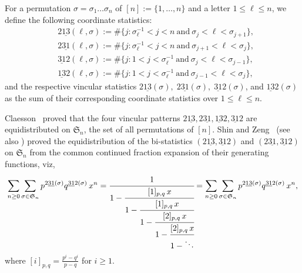\documentclass[12pt,reqno]{amsart}
\numberwithin{equation}{section}
\theoremstyle{plain}
\theoremstyle{definition}
\def\Sym{\mathfrak{S}}
\def\rasc{\mathrm{2\underline{13}}}
\def\rdes{\mathrm{2\underline{31}}}
\def\ldes{\mathrm{\underline{31}2}}
\def\lasc{\mathrm{\underline{13}2}}
\begin{document}
 For a permutation $\sigma=\sigma_1\ldots \sigma_n$ of $[n]:=\{1, \ldots, n\}$ and a letter $1\le \ell\le n$, we define the following coordinate statistics:
\begin{align*}

&\rasc(\ell,\sigma) :=  \# \{ j : \sigma^{-1}_\ell <j <n  ~\text{and}~  \sigma_j < \ell < \sigma_{j+1}  \},  \\[3pt]
&\rdes(\ell,\sigma) :=  \# \{ j : \sigma^{-1}_\ell<j <n  ~\text{and}~  \sigma_{j+1} <\ell < \sigma_j  \},  \\[3pt]
&\ldes(\ell,\sigma) :=  \# \{ j : 1  <j <\sigma^{-1}_\ell  ~\text{and}~  \sigma_{j} < \ell < \sigma_{j-1} \}, \\[3pt]
&\lasc(\ell,\sigma) :=  \# \{ j : 1  < j <\sigma^{-1}_\ell  ~\text{and}~  \sigma_{j-1} < \ell < \sigma_{j} \},
\end{align*}
and the respective vincular  statistics
$
\rasc(\sigma),\; \rdes(\sigma),\; \ldes(\sigma)$, and $ \lasc(\sigma)
$
as the sum of their corresponding coordinate statistics over $1\leq \ell\leq n$. 

Claesson~\cite[Proposition 7]{Cl01}   proved that the four vincular patterns
$\rasc, \rdes, \lasc, \ldes$ are equidistributed on $\Sym_n$, the set of all permutations of $[n]$. Shin and Zeng~\cite[Eq.~(39)]{SZ12} (see also \cite[Lemma 3.1]{FTHZ19})  proved  the equidistribution of  the bi-statistics  $(\rasc, \ldes)$ and $(\rdes, \ldes)$  on $\Sym_n$  from the common continued fraction expansion of their generating functions, viz, 
\begin{align}\label{continued fraction}
\sum_{n\geq 0} \sum_{\sigma\in \Sym_n}p^{\rdes(\sigma)}q^{\ldes(\sigma)}\,x^n
=\cfrac{1}{1-\cfrac{[1]_{p,q}\, x}{1-\cfrac{[1]_{p,q}\, x}{1-\cfrac{[2]_{p,q}\, x}{1-\cfrac{[2]_{p,q} \,x}{1-\ddots}}}}}
=\sum_{n\geq 0} \sum_{\sigma\in \Sym_n}p^{\rasc(\sigma)}q^{\ldes(\sigma)}\,x^n,
\end{align}
where $[i]_{p,q}=\frac{p^i-q^i}{p-q}$  for $i\geq 1$.
\end{document}
